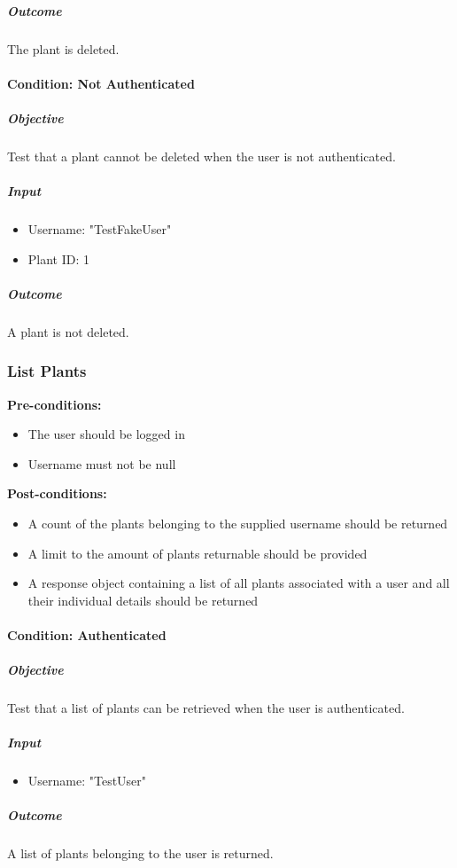 \documentclass{article}
\begin{document}
		\subparagraph{Outcome}
		The plant is deleted.
		
		\paragraph{Condition: Not Authenticated}
		\subparagraph{Objective}
		Test that a plant cannot be deleted when the user is not authenticated.
		
		\subparagraph{Input}
		\begin{itemize}
			\item Username: "TestFakeUser"
			\item Plant ID: 1
		\end{itemize}
		
		\subparagraph{Outcome}
		A plant is not deleted.
		
		\subsubsection{List Plants}
		
		\textbf{Pre-conditions:}
		\begin{itemize}
			\item The user should be logged in
			\item Username must not be null
		\end{itemize}
		\textbf{Post-conditions:}
		\begin{itemize}
			\item A count of the plants belonging to the supplied username should be returned
			\item A limit to the amount of plants returnable should be provided
			\item A response object containing a list of all plants associated with a user and all their individual details should be returned
		\end{itemize}
		
		\paragraph{Condition: Authenticated}
		\subparagraph{Objective}
		Test that a list of plants can be retrieved when the user is authenticated.
		\subparagraph{Input}
		\begin{itemize}
			\item Username: "TestUser"
		\end{itemize}
		
		\subparagraph{Outcome}
		A list of plants belonging to the user is returned.
		
\end{document}
